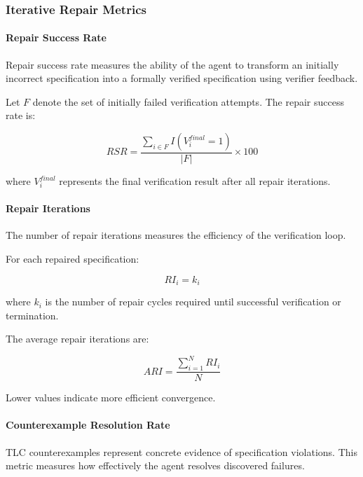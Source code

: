 \subsubsection{Iterative Repair Metrics}

\paragraph{Repair Success Rate}

Repair success rate measures the ability of the agent to transform an initially
incorrect specification into a formally verified specification using verifier
feedback.

Let $F$ denote the set of initially failed verification attempts. The repair
success rate is:

\begin{equation}
RSR =
\frac{\sum_{i \in F} I(V_i^{final}=1)}
{|F|}
\times 100
\end{equation}

where $V_i^{final}$ represents the final verification result after all repair
iterations.

\paragraph{Repair Iterations}

The number of repair iterations measures the efficiency of the verification loop.

For each repaired specification:

\begin{equation}
RI_i = k_i
\end{equation}

where $k_i$ is the number of repair cycles required until successful verification
or termination.

The average repair iterations are:

\begin{equation}
ARI =
\frac{\sum_{i=1}^{N} RI_i}{N}
\end{equation}

Lower values indicate more efficient convergence.

\paragraph{Counterexample Resolution Rate}

TLC counterexamples represent concrete evidence of specification violations.
This metric measures how effectively the agent resolves discovered failures.

